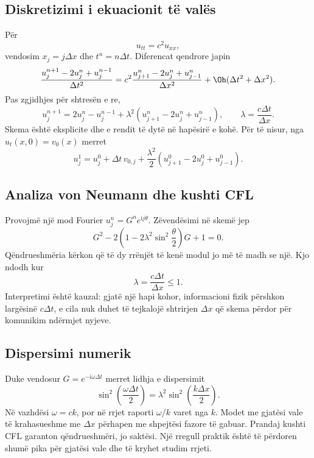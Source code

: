 \subsection{Diskretizimi i ekuacionit të valës}
Për
\begin{equation}
 u_{tt}=c^2u_{xx},
\end{equation}
vendosim $x_j=j\Delta x$ dhe $t^n=n\Delta t$. Diferencat qendrore japin
\begin{equation}
 \frac{u_j^{n+1}-2u_j^n+u_j^{n-1}}{\Delta t^2}
 =c^2\frac{u_{j+1}^n-2u_j^n+u_{j-1}^n}{\Delta x^2}
 +\Oh(\Delta t^2+\Delta x^2).
\end{equation}
Pas zgjidhjes për shtresën e re,
\begin{equation}
 u_j^{n+1}=2u_j^n-u_j^{n-1}
 +\lambda^2(u_{j+1}^n-2u_j^n+u_{j-1}^n),
 \qquad \lambda=\frac{c\Delta t}{\Delta x}.
\end{equation}
Skema është eksplicite dhe e rendit të dytë në hapësirë e kohë. Për të nisur, nga $u_t(x,0)=v_0(x)$ merret
\begin{equation}
 u_j^1=u_j^0+\Delta t\,v_{0,j}
 +\frac{\lambda^2}{2}(u_{j+1}^0-2u_j^0+u_{j-1}^0).
\end{equation}

\subsection{Analiza von Neumann dhe kushti CFL}
Provojmë një mod Fourier $u_j^n=G^ne^{\mathrm{i}j\theta}$. Zëvendësimi në skemë jep
\begin{equation}
 G^2-2\left(1-2\lambda^2\sin^2\frac\theta2\right)G+1=0.
\end{equation}
Qëndrueshmëria kërkon që të dy rrënjët të kenë modul jo më të madh se një. Kjo ndodh kur
\begin{equation}
 \lambda=\frac{c\Delta t}{\Delta x}\le1.
\end{equation}
Interpretimi është kauzal: gjatë një hapi kohor, informacioni fizik përshkon largësinë $c\Delta t$, e cila nuk duhet të tejkalojë shtrirjen $\Delta x$ që skema përdor për komunikim ndërmjet nyjeve.

\subsection{Dispersimi numerik}
Duke vendosur $G=e^{-\mathrm{i}\omega\Delta t}$ merret lidhja e dispersimit
\begin{equation}
 \sin^2\left(\frac{\omega\Delta t}{2}\right)
 =\lambda^2\sin^2\left(\frac{k\Delta x}{2}\right).
\end{equation}
Në vazhdësi $\omega=ck$, por në rrjet raporti $\omega/k$ varet nga $k$. Modet me gjatësi vale të krahasueshme me $\Delta x$ përhapen me shpejtësi fazore të gabuar. Prandaj kushti CFL garanton qëndrueshmëri, jo saktësi. Një rregull praktik është të përdoren shumë pika për gjatësi vale dhe të kryhet studim rrjeti.

